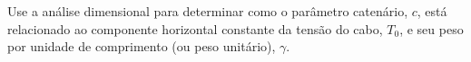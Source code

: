 Use a análise dimensional para determinar como o parâmetro catenário, $c$, está relacionado ao componente horizontal constante da tensão do cabo, $T_0$, e seu peso por unidade de comprimento (ou peso unitário), $\gamma$.

